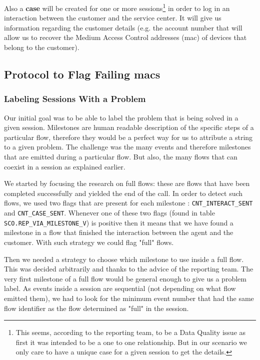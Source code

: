 Also a \textbf{case} will be created for one or more sessions\footnote{This seems, according to the reporting team, to be a Data Quality issue as first it was intended to be a one to one relationship. But in our scenario we only care to have a unique case for a given session to get the details.} in order to log in an interaction between the customer and the service center. It will give us information regarding the customer details (e.g. the account number that will allow us to recover the Medium Access Control addresses (\acrshort{mac}) of devices that belong to the customer).

\subsection{Protocol to Flag Failing \acrshort{mac}s}
\subsubsection{Labeling Sessions With a Problem}
Our initial goal was to be able to label the problem that is being solved in a given session. Milestones are human readable description of the specific steps of a particular flow, therefore they would be a perfect way for us to attribute a string to a given problem. The challenge was the many events and therefore milestones that are emitted during a particular flow. But also, the many flows that can coexist in a session as explained earlier.

We started by focusing the research on full flows: these are flows that have been completed successfully and yielded the end of the call. In order to detect such flows, we used two flags that are present for each milestone : \texttt{CNT\_INTERACT\_SENT} and \texttt{CNT\_CASE\_SENT}. Whenever one of these two flags (found in table \texttt{SCO.REP\_VIA\_MILESTONE\_V}) is positive then it means that we have found a milestone in a flow that finished the interaction between the agent and the customer. With such strategy we could flag "full" flows.

Then we needed a strategy to choose which milestone to use inside a full flow. This was decided arbitrarily and thanks to the advice of the reporting team. The very first milestone of a full flow would be general enough to give us a problem label. As events inside a session are sequential (not depending on what flow emitted them), we had to look for the minimum event number that had the same flow identifier as the flow determined as "full" in the session. 

